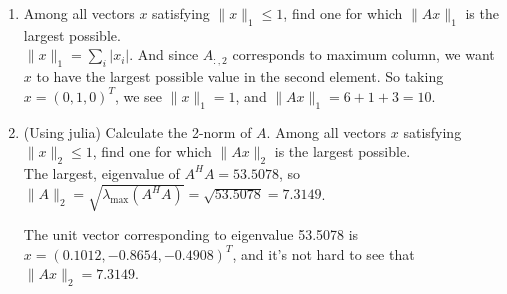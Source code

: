 \documentclass[11pt]{article}
\newcommand{\n}{\vspace{0.2cm}}
\begin{document}
\begin{enumerate}
\begin{enumerate}[label=(\alph*)]
		      \item Among all vectors \(x\) satisfying \(\lVert x \rVert_1 \leq 1\), find one for which \(\lVert Ax \rVert_1\) is the largest possible. \n\\
		            \(\lVert x \rVert_1 = \sum_{i} |x_i|\).  And since \(A_{:,2}\) corresponds to maximum column, we want \(x\) to have the largest possible value in the second element.  So taking \(x = (0,1,0)^T\), we see \(\lVert x \rVert_1 = 1\), and \(\lVert Ax \rVert_1 = 6 + 1 + 3 = 10\).

		      \item (Using julia) Calculate the 2-norm of \(A\).  Among all vectors \(x\) satisfying \(\lVert x \rVert_2 \leq 1\), find one for which \(\lVert Ax \rVert_2\) is the largest possible. \n\\
		            The largest, eigenvalue of \(A^HA = 53.5078\), so \(\lVert A \rVert_2 = \sqrt{\lambda_{\text{max}}(A^HA)} = \sqrt{53.5078} = 7.3149\). \n

		            The unit vector corresponding to eigenvalue 53.5078 is \(x = (0.1012, -0.8654, -0.4908)^T\), and it's not hard to see that \(\lVert Ax \rVert_2 = 7.3149\).
	      \end{enumerate}


\end{enumerate}
\end{document}
